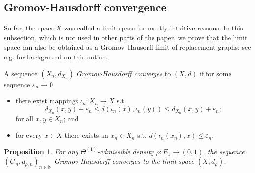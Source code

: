 \documentclass{amsart}
\newtheorem{proposition}[equation]{Proposition}
\numberwithin{equation}{section}
\theoremstyle{definition}
\theoremstyle{remark}
\newcommand{\N}{\mathbb{N}}
\begin{document}
\subsection{Gromov-Hausdorff convergence}
So far, the space $X$ was called a limit space for mostly intuitive reasons. In this subsection, which is not used in other parts of the paper, we prove that the limit space can also be obtained as a Gromov--Hausorff limit of replacement graphs; see e.g. \cite{bbi} for background on this notion. 

A sequence $(X_n, d_{X_n})$ \emph{Gromov-Hausdorff converges} to $(X,d)$ if for some sequence $\varepsilon_n \to 0$
\begin{itemize}
\item there exist mappings $\iota_n:X_n\to X$ s.t.
\[
d_{X_n}(x,y)-\varepsilon_n\leq d(\iota_n(x),\iota_n(y)) \leq d_{X_n}(x,y)+\varepsilon_n; 
\]
for all $x,y\in X_n$; and
\item for every $x\in X$ there exists an $x_n\in X_n$ s.t. $d(\iota_n(x_n),x)\leq \varepsilon_n$.
\end{itemize}


\begin{proposition}\label{Proposition: GH-convergence}
    For any \(\Theta^{(1)}\)-admissible density \(\rho\colon E_1\to (0,1)\), the sequence \( (G_n,d_{\rho,n}) _{n \in \N}\) Gromov-Hausdorff converges to the limit space \((X,d_{\rho})\).
\end{proposition}
\end{document}
